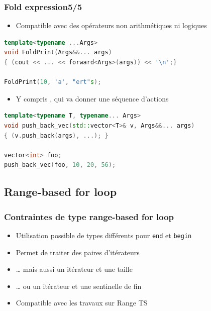 \documentclass[C++.tex]{subfiles}
\begin{document}
\begin{frame}[fragile]
	\frametitle{Fold expression\titlehfill{}5/5}
	\begin{itemize}
		\item Compatible avec des opérateurs non arithmétiques ni logiques
	\end{itemize}

	\begin{lstlisting}[language=C++]
template<typename ...Args>
void FoldPrint(Args&&... args)
{ (cout << ... << forward<Args>(args)) << '\n';}

FoldPrint(10, 'a', "ert"s);\end{lstlisting}

	\begin{itemize}
		\item Y compris \og ,\fg{} qui va donner une séquence d'actions
	\end{itemize}

	\begin{lstlisting}[language=C++]
template<typename T, typename... Args>
void push_back_vec(std::vector<T>& v, Args&&... args)
{ (v.push_back(args), ...); }

vector<int> foo;
push_back_vec(foo, 10, 20, 56);\end{lstlisting}
\end{frame}

\subsection*{Range-based for loop}
\begin{frame}[fragile]
	\frametitle{Contraintes de type range-based for loop}
	\begin{itemize}
		\item Utilisation possible de types différents pour \lstinline|end| et \lstinline|begin|
		\item Permet de traiter des paires d'itérateurs
		\item \ldots{} mais aussi un itérateur et une taille
		\item \ldots{} ou un itérateur et une sentinelle de fin
		\item Compatible avec les travaux sur Range TS
		
	\end{itemize}
\end{frame}
\end{document}
